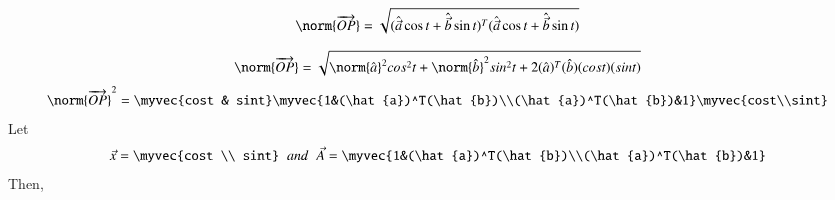 \documentclass[journal]{IEEEtran}
\theoremstyle{remark}
\begin{document}
\begin{align}
    \norm{\overrightarrow{OP}}=\sqrt{(\hat{\vec{a}}\cos{t} + \hat{\vec{b}}\sin{t})^T(\hat{\vec{a}}\cos{t} + \hat{\vec{b}}\sin{t})}
\end{align}

\begin{align}
   \norm{\overrightarrow{OP}}=\sqrt{\norm{\hat{a}}^2cos^2t+ \norm{\hat{b}}^2sin^2t+2(\hat{a})^T(\hat{b})(cost)(sint)}
\end{align}
\begin{align}
       \norm{\overrightarrow{OP}}^2=\myvec{cost & sint}\myvec{1&(\hat{a})^T(\hat{b})\\(\hat{a})^T(\hat{b})&1}\myvec{cost\\sint}
\end{align}
Let
\begin{align}
    \Vec{x}= \myvec{cost \\ sint} \;\;and\;\;\vec{A}=\myvec{1&(\hat{a})^T(\hat{b})\\(\hat{a})^T(\hat{b})&1}
\end{align}
Then, 
\end{document}
